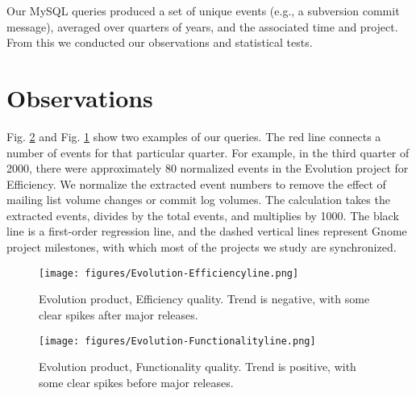 \documentclass[conference, compsoc]{IEEEtran}
\begin{document}
Our MySQL queries produced a set of unique events (e.g., a subversion commit message), averaged over quarters of years, and the associated time and project. From this we conducted our observations and statistical tests.

\section{Observations}
\label{sec:observations}
Fig. \ref{fig:ev-func-line} and Fig. \ref{fig:ev-eff-line} show two examples of our queries. The red line connects a number of events for that particular quarter. For example, in the third quarter of 2000, there were approximately 80 normalized events in the Evolution project for Efficiency. We normalize the extracted event numbers to remove the effect of mailing list volume changes or commit log volumes. The calculation takes the extracted events, divides by the total events, and multiplies by 1000. The black line is a first-order regression line, and the dashed vertical lines represent Gnome project milestones, with which most of the projects we study are synchronized.
 

\begin{figure}[h]
	\centering
	\texttt{[image: figures/Evolution-Efficiencyline.png]}
\label{fig:ev-eff-line}
\caption{Evolution product, Efficiency quality. Trend is negative, with some clear spikes after major releases.}
\end{figure}

\begin{figure}[h]
\centering
\texttt{[image: figures/Evolution-Functionalityline.png]}
\label{fig:ev-func-line}
\caption{Evolution product, Functionality quality. Trend is positive, with some clear spikes before major releases.}
\end{figure}

\end{document}
